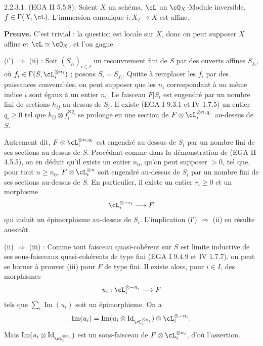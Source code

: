 \begin{lemme} 2.2.3.1. (EGA II 5.5.8).
Soient $X$ un sch\'{e}ma, $\cL$ un $\cO_X$-Module inversible, $f \in \Gamma(X, \cL)$. L'immersion canonique $i : X_f \rightarrow X$ est affine.
\end{lemme}

\noindent\textbf{Preuve.} C'est trivial : la question est locale sur $X$, donc on peut supposer $X$ affine et $\cL \simeq \cO_X$, et l'on gagne.

(i') $\Rightarrow$ (ii) : Soit $(S_{f_i})_{i \in I}$ un recouvrement fini de $S$ par des ouverts affines $S_{f_i}$, o\`{u} $f_i \in \Gamma(S, \cL_i^{\otimes n_i})$ ; posons $S_i = S_{f_i}$. Quitte \`{a} remplacer les $f_i$ par des puissances convenables, on peut supposer que les $n_i$ correspondant \`{a} un m\^{e}me indice $i$ sont \'{e}gaux \`{a} un entier $n_i$. Le faisceau $F|S_i$ est engendr\'{e} par un nombre fini de sections $h_{ij}$ au-dessus de $S_i$. Il existe (EGA I 9.3.1 et IV 1.7.5) un entier $q_i \geq 0$ tel que $h_{ij} \otimes f_i^{\otimes q_i}$ se prolonge en une section de $F \otimes \cL_i^{\otimes n_i q_i}$ au-dessus de $S$.

Autrement dit, $F \otimes \cL_i^{\otimes n_i q_i}$ est engendr\'{e} au-dessus de $S_i$ par un nombre fini de ses sections au-dessus de $S$. Proc\'{e}dant comme dans la d\'{e}monstration de (EGA II 4.5.5), on en d\'{e}duit qu'il existe un entier $n_0$, qu'on peut supposer $> 0$, tel que, pour tout $n \geq n_0$, $F \otimes \cL_i^{\otimes n}$ soit engendr\'{e} au-dessus de $S_i$ par un nombre fini de ses sections au-dessus de $S$. En particulier, il existe un entier $r_i \geq 0$ et un morphisme
\[
\cL_i^{\otimes -r_i} \longrightarrow F
\]
qui induit un \'{e}pimorphisme au-dessus de $S_i$. L'implication (i') $\Rightarrow$ (ii) en r\'{e}sulte aussit\^{o}t.

(ii) $\Rightarrow$ (iii) : Comme tout faisceau quasi-coh\'{e}rent sur $S$ est limite inductive de ses sous-faisceaux quasi-coh\'{e}rents de type fini (EGA I 9.4.9 et IV 1.7.7), on peut se borner \`{a} prouver (iii) pour $F$ de type fini. Il existe alors, pour $i \in I$, des morphismes
\[
u_i : \cL_i^{\otimes -n_i} \longrightarrow F
\]
tels que $\sum_i \operatorname{Im}(u_i)$ soit un \'{e}pimorphisme. On a
\[
\operatorname{Im}(u_i) = \operatorname{Im}(u_i \otimes \operatorname{Id}_{\cL_i^{\otimes n_i}}) \otimes \cL_i^{\otimes -n_i} .
\]
Mais $\operatorname{Im}(u_i \otimes \operatorname{Id}_{\cL_i^{\otimes n_i}})$ est un sous-faisceau de $F \otimes \cL_i^{\otimes n_i}$, d'o\`{u} l'assertion.

